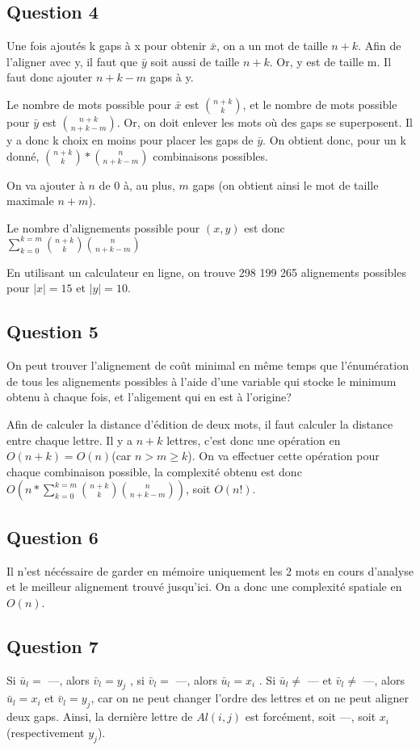 \documentclass{report}
\begin{document}
\subsection*{Question 4}
Une fois ajoutés k gaps à x pour obtenir $\bar{x}$, on a un mot de taille $n+k$. Afin de l'aligner avec y, il faut que $\bar{y}$ soit aussi de taille $n+k$. Or, y est de taille m. Il faut donc ajouter $n+k-m$ gaps à y.

Le nombre de mots possible pour $\bar{x}$ est $\binom{n+k}{k}$, et le nombre de mots possible pour $\bar{y}$ est  $\binom{n+k}{n+k-m}$. Or, on doit enlever les mots où des gaps se superposent. Il y a donc k choix en moins pour placer les gaps de $\bar{y}$. On obtient donc, pour un k donné, $\binom{n+k}{k}*\binom{n}{n+k-m}$ combinaisons possibles.

On va ajouter à $n$ de 0 à, au plus, $m$ gaps (on obtient ainsi le mot de taille maximale $n+m$).

Le nombre d'alignements possible pour $(x,y)$ est donc $ \sum_{k=0}^{k=m}\binom{n+k}{k}\binom{n}{n+k-m}$

En utilisant un calculateur en ligne, on trouve 298 199 265 alignements possibles pour $|x|=15$ et $|y|=10$.

\subsection*{Question 5}
On peut trouver l'alignement de coût minimal en même temps que l'énumération de tous les alignements possibles à l'aide d'une variable qui stocke le minimum obtenu à chaque fois, et l'aligement qui en est à l'origine?

Afin de calculer la distance d'édition de deux mots, il faut calculer la distance entre chaque lettre. Il y a $n+k$ lettres, c'est donc une opération en $O(n+k)=O(n)$(car $n>m\ge k$). On va effectuer cette opération pour chaque combinaison possible, la complexité obtenu est donc $O(n*\sum_{k=0}^{k=m}\binom{n+k}{k}\binom{n}{n+k-m})$, soit $O(n!)$.


\subsection*{Question 6}
Il n'est nécéssaire de garder en mémoire uniquement les 2 mots en cours d'analyse et le meilleur alignement trouvé jusqu'ici. On a donc une complexité spatiale en $O(n)$.


\clearpage

\subsection*{Question 7}
Si $\bar{u}_{l} = $ ---, alors $\bar{v}_{l} = y_{j}$ , si  $\bar{v}_{l} = $ ---, alors $\bar{u}_{l} = x_{i}$ . Si $\bar{u}_{l} \ne $ --- et $\bar{v}_{l} \ne $ ---, alors $\bar{u}_{l} = x_{i}$ et $\bar{v}_{l} = y_{j}$, car on ne peut changer l'ordre des lettres et on ne peut aligner deux gaps. Ainsi, la dernière lettre de $Al(i,j)$ est forcément, soit ---, soit $x_{i}$ (respectivement $y_{j}$).
\end{document}
